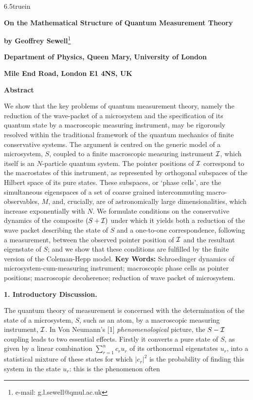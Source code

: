 \hsize 6.5truein
\centerline {\bf  On the Mathematical Structure of  Quantum Measurement Theory}
\vskip 1cm
\centerline {{\bf by Geoffrey Sewell}\footnote*{e-mail: g.l.sewell@qmul.ac.uk}}
\vskip 0.5cm
\centerline {\bf Department of Physics, Queen Mary, University of London}
\vskip 0.5cm
\centerline {\bf Mile End Road, London E1 4NS, UK}
\vskip 1cm
\centerline {\bf Abstract}
\vskip 0.5cm
We show that the key problems of quantum measurement theory, namely the reduction of 
the wave-packet of a microsystem and the specification of its quantum state by a 
macroscopic measuring instrument, may be rigorously resolved within the traditional 
framework of the quantum mechanics of finite conservative systems. The argument is 
centred on the generic model of a microsystem, $S$, coupled to a finite macroscopic 
measuring instrument ${\cal I}$, which itself is an $N$-particle quantum system. The 
pointer positions of ${\cal I}$ correspond to the macrostates of this instrument, as 
represented by orthogonal subspaces of the Hilbert space of its pure states. These 
subspaces, or \lq phase cells\rq , are the simultaneous eigenspaces of a set of coarse 
grained intercommuting macro-observables, $M$, and, crucially, are of astronomically 
large dimensionalities, which increase exponentially with $N$. We formulate conditions 
on the conservative dynamics of the composite $(S+{\cal I})$ under which it yields both 
a reduction of the wave packet describing the state of $S$ and a one-to-one 
correspondence, following a measurement, between the observed  pointer position of 
${\cal I}$ and the resultant eigenstate of $S$; and we show that these conditions are 
fulfilled by the finite version of the Coleman-Hepp model.
\vskip 1cm
{\bf Key Words:} Schroedinger dynamics of microsystem-cum-measuring instrument; 
macroscopic phase cells as pointer positions; macroscopic decoherence; reduction of 
wave packet of microsystem.
 \vfill\eject
\centerline {\bf 1. Introductory Discussion.} 
\vskip 0.3cm
The quantum theory of measurement is concerned with the determination of the state of a 
microsystem, $S$, such as an atom, by a macroscopic measuring instrument, ${\cal I}$. 
In Von Neumann\rq s [1] {\it phenomenological} picture, the $S-{\cal I}$  coupling  
leads to two essential effects. Firstly it converts a pure state of $S$, as given by a linear 
combination ${\sum}_{r=1}^{n}c_{r}u_{r}$ of its orthonormal eigenstates $u_{r}$, 
into a statistical mixture of these states for which ${\vert}c_{r}{\vert}^{2}$ is the 
probability of finding this system in the state $u_{r}$: this is the phenomenon often 
